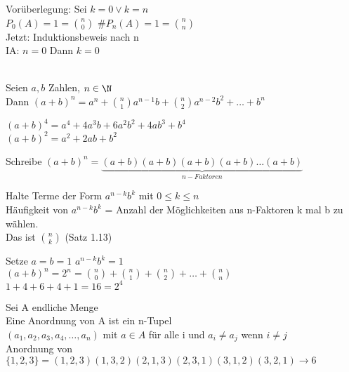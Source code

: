 \bew
Vorüberlegung: Sei $k=0 \vee k=n$\\
$P_0(A)=1=\binom{n}{0}$ $\#P_n(A)=1=\binom{n}{n}$\ok\\
Jetzt: Induktionsbeweis nach n\\
IA: $n=0$ Dann $k=0$\ok\\
\\

Seien $a,b$ Zahlen, $n\in\N$\\
Dann $(a+b)^n=a^n+\binom{n}{1} a^{n-1} b+\binom{n}{2}a^{n-2}b^2+…+b^n$

\bsp
$(a+b)^4=a^4+4a^3b+6a^2b^2+4ab^3+b^4$\\
$(a+b)^2=a^2+2ab+b^2$

\bew
Schreibe $(a+b)^n=\underbrace{(a+b)(a+b)(a+b)(a+b)…(a+b)}_{n-Faktoren}$

Halte Terme der Form $a^{n-k}b^k$ mit $0\leq k\leq n$\\
Häufigkeit von $a^{n-k}b^k$ = Anzahl der Möglichkeiten aus n-Faktoren k mal b zu wählen.\\
Das ist $\binom{n}{k}$ (Satz 1.13)

Setze $a=b=1$ \hspace{1cm} $a^{n-k}b^k=1$\\
$(a+b)^n=2^n=\binom{n}{0}+\binom{n}{1}+\binom{n}{2}+…+\binom{n}{n}$\\

\bsp
$1+4+6+4+1=16=2^4$

Sei A endliche Menge\\
Eine Anordnung von A ist ein n-Tupel\\
$(a_1,a_2,a_3,a_4,…,a_n)$ mit $a\in A$ für alle i und $a_i\neq a_j$ wenn $i\neq j$\\

\bsp
Anordnung von $\{1,2,3\}=(1,2,3)(1,3,2)(2,1,3)(2,3,1)(3,1,2)(3,2,1)→6$

